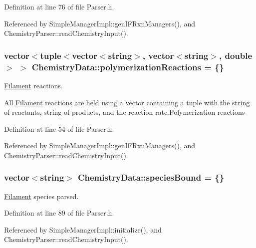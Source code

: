 Definition at line 76 of file Parser.\+h.



Referenced by Simple\+Manager\+Impl\+::gen\+I\+F\+Rxn\+Managers(), and Chemistry\+Parser\+::read\+Chemistry\+Input().

\hypertarget{structChemistryData_a407c6129330a3cffc5afb45f83936945}{
\subsubsection[{polymerization\+Reactions}]{\setlength{\rightskip}{0pt plus 5cm}vector$<$tuple$<$vector$<$string$>$, vector$<$string$>$, double$>$ $>$ Chemistry\+Data\+::polymerization\+Reactions = \{\}}}\label{structChemistryData_a407c6129330a3cffc5afb45f83936945}


\hyperlink{classFilament}{Filament} reactions. 

All \hyperlink{classFilament}{Filament} reactions are held using a vector containing a tuple with the string of reactants, string of products, and the reaction rate.\+Polymerization reactions 

Definition at line 54 of file Parser.\+h.



Referenced by Simple\+Manager\+Impl\+::gen\+I\+F\+Rxn\+Managers(), and Chemistry\+Parser\+::read\+Chemistry\+Input().

\hypertarget{structChemistryData_acab0ca129148f43eaa33847782411b3a}{
\subsubsection[{species\+Bound}]{\setlength{\rightskip}{0pt plus 5cm}vector$<$string$>$ Chemistry\+Data\+::species\+Bound = \{\}}}\label{structChemistryData_acab0ca129148f43eaa33847782411b3a}


\hyperlink{classFilament}{Filament} species parsed. 



Definition at line 89 of file Parser.\+h.



Referenced by Simple\+Manager\+Impl\+::initialize(), and Chemistry\+Parser\+::read\+Chemistry\+Input().

